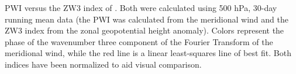 \label{fig:metric_vs_zw3}
PWI versus the ZW3 index of \citet{Raphael2004}. Both were calculated using 500 hPa, 30-day running mean data (the PWI was calculated from the meridional wind and the ZW3 index from the zonal geopotential height anomaly). Colors represent the phase of the wavenumber three component of the Fourier Transform of the meridional wind, while the red line is a linear least-squares line of best fit. Both indices have been normalized to aid visual comparison.